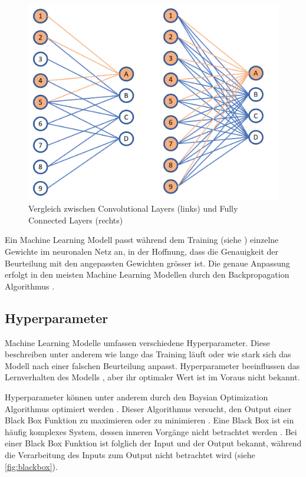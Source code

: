 \begin{figure}[!ht]
   \centering
   \includegraphics[width=\textwidth]{images/theorie/conv-v-dens.png}
   \caption{Vergleich zwischen Convolutional Layers (links) und Fully Connected Layers (rechts) \cite{unzueta_convolutional_2022}}\label{fig:conv-v-dens}
\end{figure}
 
Ein Machine Learning Modell passt während dem Training (siehe
) einzelne Gewichte im neuronalen Netz an, in der Hoffnung,
dass die Genauigkeit der Beurteilung mit den angepassten Gewichten grösser
ist. Die genaue Anpassung erfolgt in den meisten Machine Learning Modellen durch
den Backpropagation Algorithmus
\cite{ognjanovski_everything_2020}\cite{david_e_rumelhart_learning_nodate}.
 
 
 
\subsection{Hyperparameter}\label{sub:t_ml_hyper}
Machine Learning Modelle umfassen verschiedene Hyperparameter. Diese beschreiben
unter anderem wie lange das Training läuft oder wie stark sich das Modell nach
einer falschen Beurteilung anpasst. Hyperparameter beeinflussen das
Lernverhalten des Modells \cite{nyuytiymbiy_parameters_2022}, aber ihr
optimaler Wert ist im Voraus nicht bekannt.
 
Hyperparameter können unter anderem durch den Baysian Optimization Algorithmus
optimiert werden \cite{agnihotri_exploring_2020}\cite{paretos_bayesian_2021}.
Dieser Algorithmus versucht, den Output einer Black Box Funktion zu maximieren
oder zu minimieren \cite[S. 15]{garnett_bayesian_nodate}. Eine Black Box ist ein
häufig komplexes System, dessen inneren Vorgänge nicht betrachtet werden
\cite{noauthor_black_2021}. Bei einer Black Box Funktion ist folglich der Input
und der Output bekannt, während die Verarbeitung des Inputs zum Output nicht
betrachtet wird (siehe \autoref{fig:blackbox}).
 
